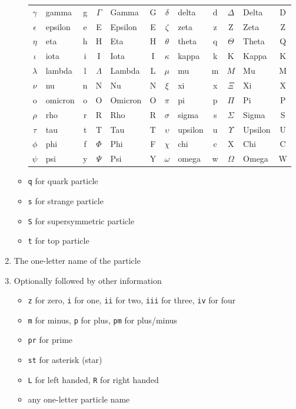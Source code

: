 \documentclass{article}
\begin{document}
\begin{enumerate}
\begin{itemize}
\begin{center}
\begin{tabular}{*{4}{|cl>{\ttfamily}c}|}
$\gamma$  & gamma    & g    & $\Gamma$  & Gamma    & G     &
$\delta$  & delta    & d    & $\Delta$  & Delta    & D     \\
$\epsilon$& epsilon  & e    & E         & Epsilon  & E     &
$\zeta$   & zeta     & z    & Z         & Zeta     & Z     \\
$\eta$    & eta      & h    & H         & Eta      & H     &
$\theta$  & theta    & q    & $\Theta$  & Theta    & Q     \\
$\iota$   & iota     & i    & I         & Iota     & I     &
$\kappa$  & kappa    & k    & K         & Kappa    & K     \\
$\lambda$ & lambda   & l    & $\Lambda$ & Lambda   & L     &
$\mu$     & mu       & m    & $M$       & Mu       & M     \\
$\nu$     & nu       & n    & N         & Nu       & N     &
$\xi$     & xi       & x    & $\Xi$     & Xi       & X     \\
o         & omicron  & o    & O         & Omicron  & O     &
$\pi$     & pi       & p    & $\Pi$     & Pi       & P     \\
$\rho$    & rho      & r    & R         & Rho      & R     &
$\sigma$  & sigma    & s    & $\Sigma$  & Sigma    & S     \\
$\tau$    & tau      & t    & T         & Tau      & T     &
$\upsilon$& upsilon  & u    & $\Upsilon$& Upsilon  & U     \\
$\phi$    & phi      & f    & $\Phi$    & Phi      & F     &
$\chi$    & chi      & c    & X         & Chi      & C     \\
$\psi$    & psi      & y    & $\Psi$    & Psi      & Y     &
$\omega$  & omega    & w    & $\Omega$  & Omega    & W     \\
\hline
\end{tabular}
\end{center}
\item \texttt{q} for quark particle
\item \texttt{s} for strange particle
\item \texttt{S} for supersymmetric particle
\item \texttt{t} for top particle
\end{itemize}
 
\item The one-letter name of the particle
\item Optionally followed by other information
\begin{itemize}
\item \texttt{z} for zero, \texttt{i} for one, \texttt{ii} for two,
\texttt{iii} for three, \texttt{iv} for four
\item \texttt{m} for minus, \texttt{p} for plus, \texttt{pm} for plus/minus
\item \texttt{pr} for prime
\item \texttt{st} for asterisk (star)
\item \texttt{L} for left handed, \texttt{R} for right handed
\item any one-letter particle name
\end{itemize}
\end{enumerate}
 
\end{document}
